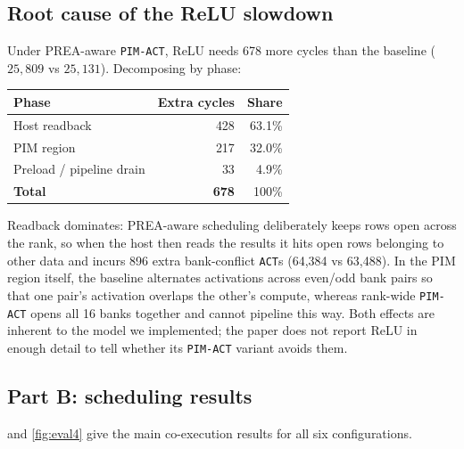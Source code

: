 \documentclass[conference]{IEEEtran}
\newcommand{\cmd}[1]{\texttt{\footnotesize #1}}
\newcommand{\pimact}{\cmd{PIM-ACT}\xspace}
\begin{document}
\subsection{Root cause of the ReLU slowdown}\label{sec:relu}
Under PREA-aware \pimact, ReLU needs 678 more cycles than the baseline ($25{,}809$ vs $25{,}131$). Decomposing by phase:
\begin{center}
\small
\begin{tabular}{@{}lrr@{}}
\toprule
\textbf{Phase} & \textbf{Extra cycles} & \textbf{Share}\\
\midrule
Host readback & 428 & 63.1\%\\
PIM region & 217 & 32.0\%\\
Preload / pipeline drain & 33 & 4.9\%\\
\midrule
\textbf{Total} & \textbf{678} & 100\%\\
\bottomrule
\end{tabular}
\end{center}
Readback dominates: PREA-aware scheduling deliberately keeps rows open across the rank, so when the host then reads the results it hits open rows belonging to other data and incurs 896 extra bank-conflict \cmd{ACT}s (64{,}384 vs 63{,}488). In the PIM region itself, the baseline alternates activations across even/odd bank pairs so that one pair's activation overlaps the other's compute, whereas rank-wide \pimact opens all 16 banks together and cannot pipeline this way. Both effects are inherent to the model we implemented; the paper does not report ReLU in enough detail to tell whether its \pimact variant avoids them.

\subsection{Part B: scheduling results}

 and \cref{fig:eval4} give the main co-execution results for all six configurations.
\end{document}
